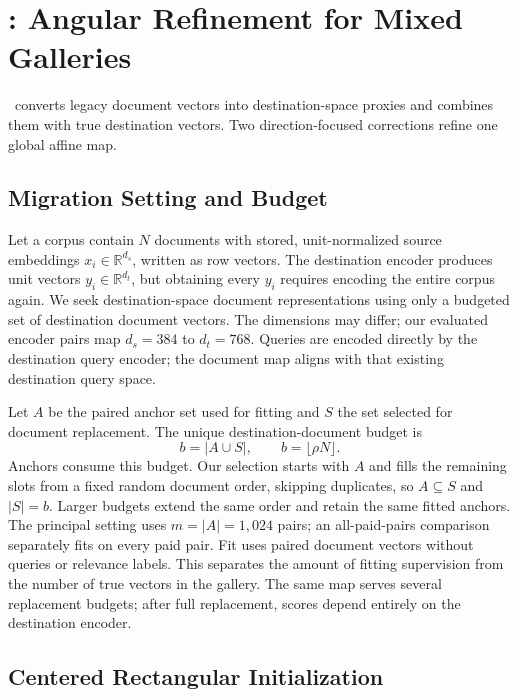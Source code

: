 \section{\method: Angular Refinement for Mixed Galleries}
\label{sec:method}

\method\ converts legacy document vectors into destination-space proxies and
combines them with true destination vectors. Two direction-focused corrections
refine one global affine map.

\subsection{Migration Setting and Budget}
\label{sec:setting}

Let a corpus contain $N$ documents with stored, unit-normalized source embeddings
$x_i\in\mathbb{R}^{d_s}$, written as row vectors. The destination encoder produces
unit vectors $y_i\in\mathbb{R}^{d_t}$, but obtaining every $y_i$ requires encoding
the entire corpus again. We seek destination-space document representations
using only a budgeted set of destination document vectors. The dimensions may
differ; our evaluated encoder pairs map $d_s=384$ to $d_t=768$. Queries are encoded
directly by the destination query encoder; the document map aligns with that
existing destination query space.

Let $A$ be the paired anchor set used for fitting and $S$ the set selected for
document replacement. The unique destination-document budget is
\begin{equation}
 b=|A\cup S|,\qquad b=\lfloor\rho N\rfloor .
 \label{eq:budget}
\end{equation}
Anchors consume this budget. Our selection starts with $A$ and fills the
remaining slots from a fixed random document order, skipping duplicates, so
$A\subseteq S$ and $|S|=b$. Larger budgets extend the same order and retain the
same fitted anchors. The principal setting uses $m=|A|=1{,}024$ pairs; an
all-paid-pairs comparison separately fits on every paid pair. Fit uses paired
document vectors without queries or relevance labels. This separates the
amount of fitting supervision from the number of true vectors in the gallery.
The same map serves several replacement budgets; after full replacement,
scores depend entirely on the destination encoder.

\subsection{Centered Rectangular Initialization}
\label{sec:initialization}

